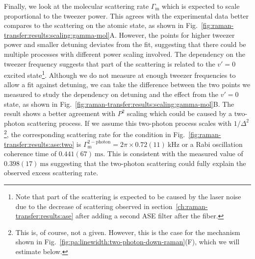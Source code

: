 Finally, we look at the molecular scattering rate $\Gamma_{\mathrm{m}}$
which is expected to scale proportional to the tweezer power.
This agrees with the experimental data better compares to the scattering on the atomic state,
as shown in Fig.~\ref{fig:raman-transfer:results:scaling:gamma-mol}A.
However, the points for higher tweezer power and smaller detuning deviates from the fit,
suggesting that there could be multiple processes with different power scaling involved.
The dependency on the tweezer frequency suggests that
part of the scattering is related to the $v'=0$ excited state\footnote{
  Note that part of the scattering is expected to be caused by the laser noise
  due to the decrease of scattering observed in section~\ref{ch:raman-transfer:results:ase}
  after adding a second ASE filter after the fiber.
}. Although we do not measure at enough tweezer frequencies to allow a fit against detuning,
we can take the difference between the two points we measured
to study the dependency on detuning and the effect from the $v'=0$ state,
as shown in Fig.~\ref{fig:raman-transfer:results:scaling:gamma-mol}B.
The result shows a better agreement with $P^2$ scaling
which could be caused by a two-photon scattering process.
If we assume this two-photon process scales with $1/\Delta^2$\footnote{
  This is, of course, not a given.
  However, this is the case for the mechanism
  shown in Fig.~\ref{fig:pa:linewidth:two-photon-down-raman}(F),
  which we will estimate below.
}, the corresponding scattering rate for the condition
in Fig.~\ref{fig:raman-transfer:results:ase:two} is
$\Gamma_{\mathrm{m}}^{\mathrm{2-photon}}=2\pi\times0.72(11)~\mathrm{kHz}$
or a Rabi oscillation coherence time of $0.441(67)~\mathrm{ms}$.
This is consistent with the measured value of $0.398(17)~\mathrm{ms}$
suggesting that the two-photon scattering could fully explain
the observed excess scattering rate.

